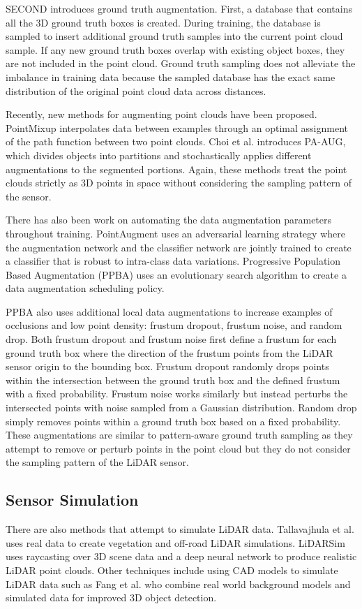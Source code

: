 \documentclass[10pt, conference, compsocconf]{IEEEtran}
\begin{document}
SECOND \cite{Yan2018} introduces ground truth augmentation. First, a database that contains all the 3D ground truth boxes is created. During training, the database is sampled to insert additional ground truth samples into the current point cloud sample. If any new ground truth boxes overlap with existing object boxes, they are not included in the point cloud. Ground truth sampling does not alleviate the imbalance in training data because the sampled database has the exact same distribution of the original point cloud data across distances.

Recently, new methods for augmenting point clouds have been proposed. PointMixup \cite{Chen2020} interpolates data between examples through an optimal assignment of the path function between two point clouds. Choi et al. \cite{Choi} introduces PA-AUG, which divides objects into partitions and stochastically applies different augmentations to the segmented portions. Again, these methods treat the point clouds strictly as 3D points in space without considering the sampling pattern of the sensor.

There has also been work on automating the data augmentation parameters throughout training. PointAugment \cite{Li2020} uses an adversarial learning strategy where the augmentation network and the classifier network are jointly trained to create a classifier that is robust to intra-class data variations. Progressive Population Based Augmentation (PPBA) \cite{Cheng2020} uses an evolutionary search algorithm to create a data augmentation scheduling policy.

PPBA also uses additional local data augmentations to increase examples of occlusions and low point density: frustum dropout, frustum noise, and random drop. Both frustum dropout and frustum noise first define a frustum for each ground truth box where the direction of the frustum points from the LiDAR sensor origin to the bounding box. Frustum dropout randomly drops points within the intersection between the ground truth box and the defined frustum with a fixed probability. Frustum noise works similarly but instead perturbs the intersected points with noise sampled from a Gaussian distribution. Random drop simply removes points within a ground truth box based on a fixed probability. These augmentations are similar to pattern-aware ground truth sampling as they attempt to remove or perturb points in the point cloud but they do not consider the sampling pattern of the LiDAR sensor.

\subsection{Sensor Simulation}
There are also methods that attempt to simulate LiDAR data. Tallavajhula et al. \cite{Tallavajhula2018} uses real data to create vegetation and off-road LiDAR simulations. LiDARSim \cite{Manivasagam2020} uses raycasting over 3D scene data and a deep neural network to produce realistic LiDAR point clouds. Other techniques include using CAD models to simulate LiDAR data such as Fang et al. \cite{Fang2020} who combine real world background models and simulated data for improved 3D object detection.
\end{document}
